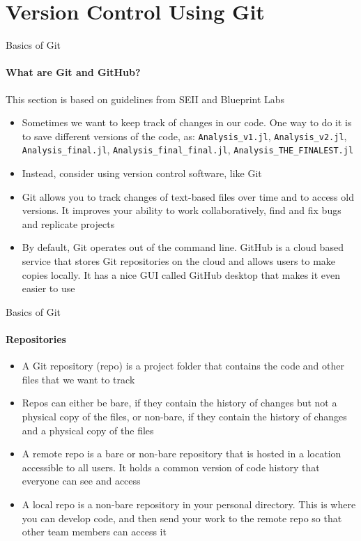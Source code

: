 \documentclass[10pt, aspectratio=169, xcolor=dvipsnames]{beamer}
\let\olditem\item
\renewcommand{\item}{%
\olditem\vspace{0.3em}}
\begin{document}
\section{Version Control Using Git}
\begin{frame}[t]{Basics of Git}
    \framesubtitle{What are Git and GitHub?}
    \footnotesize This section is based on guidelines from SEII and Blueprint Labs

    \normalsize\vspace{0.5em}
    \begin{itemize}
        \item Sometimes we want to keep track of changes in our code. One way to do it is to save different versions of the code, as: \texttt{Analysis\_v1.jl}, \texttt{Analysis\_v2.jl}, \texttt{Analysis\_final.jl}, \texttt{Analysis\_final\_final.jl}, \texttt{Analysis\_THE\_FINALEST.jl}
        \item Instead, consider using version control software, like Git
        \item Git allows you to track changes of text-based files over time and to access old versions. It improves your ability to work collaboratively, find and fix bugs and replicate projects
        \item By default, Git operates out of the command line. GitHub is a cloud based service that stores Git repositories on the cloud and allows users to make copies locally. It has a nice GUI called GitHub desktop that makes it even easier to use
    \end{itemize}
\end{frame}

\begin{frame}[t]{Basics of Git}
    \framesubtitle{Repositories}

    \normalsize\vspace{0.5em}
    \begin{itemize}
        \item A Git repository (repo) is a project folder that contains the code and other files that we want to track
        \item Repos can either be \alert{bare}, if they contain the history of changes but not a physical copy of the files, or \alert{non-bare}, if they contain the history of changes and a physical copy of the files
        \item A \alert{remote} repo is a bare or non-bare repository that is hosted in a location accessible to all users. It holds a common version of code history that everyone can see and access
        \item A \alert{local} repo is a non-bare repository in your personal directory. This is where you can develop code, and then send your work to the remote repo so that other team members can access it
    \end{itemize}
\end{frame}
\end{document}
